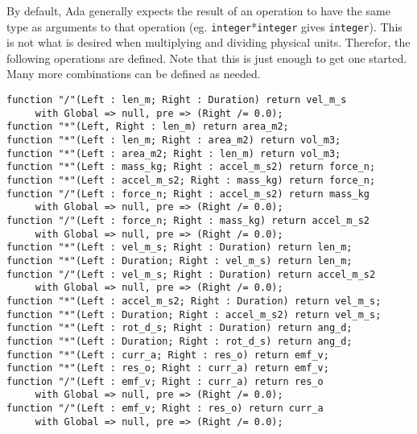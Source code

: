 \documentclass[10pt, openany]{book}
\newcommand{\datatype}[1]{\texttt{#1}}
\begin{document}
By default, Ada generally expects the result of an operation to have the same type as arguments to that operation (eg. \datatype{integer}*\datatype{integer} gives \datatype{integer}).  This is not what is desired when multiplying and dividing physical units.  Therefor, the following operations are defined.  Note that this is just enough to get one started.  Many more combinations can be defined as needed.
\begin{lstlisting}
function "/"(Left : len_m; Right : Duration) return vel_m_s
     with Global => null, pre => (Right /= 0.0);
function "*"(Left, Right : len_m) return area_m2;
function "*"(Left : len_m; Right : area_m2) return vol_m3;
function "*"(Left : area_m2; Right : len_m) return vol_m3;
function "*"(Left : mass_kg; Right : accel_m_s2) return force_n;
function "*"(Left : accel_m_s2; Right : mass_kg) return force_n;
function "/"(Left : force_n; Right : accel_m_s2) return mass_kg
     with Global => null, pre => (Right /= 0.0);
function "/"(Left : force_n; Right : mass_kg) return accel_m_s2
     with Global => null, pre => (Right /= 0.0);
function "*"(Left : vel_m_s; Right : Duration) return len_m;
function "*"(Left : Duration; Right : vel_m_s) return len_m;
function "/"(Left : vel_m_s; Right : Duration) return accel_m_s2
     with Global => null, pre => (Right /= 0.0);
function "*"(Left : accel_m_s2; Right : Duration) return vel_m_s;
function "*"(Left : Duration; Right : accel_m_s2) return vel_m_s;
function "*"(Left : rot_d_s; Right : Duration) return ang_d;
function "*"(Left : Duration; Right : rot_d_s) return ang_d;
function "*"(Left : curr_a; Right : res_o) return emf_v;
function "*"(Left : res_o; Right : curr_a) return emf_v;
function "/"(Left : emf_v; Right : curr_a) return res_o
     with Global => null, pre => (Right /= 0.0);
function "/"(Left : emf_v; Right : res_o) return curr_a
     with Global => null, pre => (Right /= 0.0);
\end{lstlisting}
\end{document}
